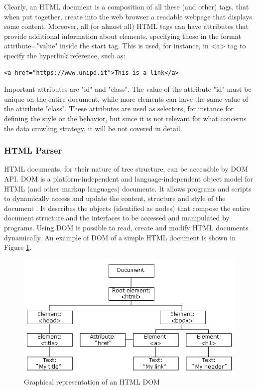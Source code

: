Clearly, an \ac{HTML} document is a composition of all these (and other) tags, that when put together, create into the web browser a readable webpage that displays some content. Moreover, all (or almost all) \ac{HTML} tags can have attributes that provide additional information about elements, specifying those in the format attribute="value" inside the start tag. This is used, for instance, in <a> tag to specify the hyperlink reference, such as:
\begin{lstlisting}
<a href="https://www.unipd.it">This is a link</a>
\end{lstlisting}
Important attributes are  "id" and "class". The value of the attribute "id"  must be unique on the entire document, while more elements can have the same value of the attribute "class". These attributes are used as selectors, for instance for defining the style or the behavior, but since it is not relevant for what concerns the data crawling strategy, it will be not covered in detail.\\


\subsubsection{HTML Parser}

HTML documents, for their nature of tree structure, can be accessible by \ac{DOM} \ac{API}. \ac{DOM} is a platform-independent and language-independent object model for HTML (and other markup languages) documents. It allows programs and scripts to dynamically access and update the content, structure and style of the document \cite{html-dom}. It describes the objects (identified as nodes) that compose the entire document structure and the interfaces to be accessed and manipulated by programs. Using \ac{DOM} is possible to read, create and modify \ac{HTML} documents dynamically. An example of \ac{DOM} of a simple HTML document is shown in Figure \ref{fig:html-dom}.

\begin{figure}[ht]
	\centering
	\includegraphics[width=1\textwidth]{figures/html-dom.png}
	\caption{Graphical representation of an HTML DOM}
	\label{fig:html-dom}
\end{figure}

